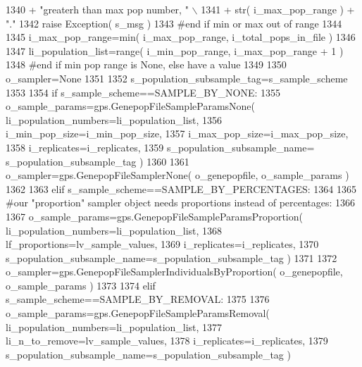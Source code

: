 \begin{DoxyCode}
1340                         + \textcolor{stringliteral}{"greaterh than max pop number, "} \(\backslash\)
1341                         + str( i\_max\_pop\_range ) + \textcolor{stringliteral}{"."} 
1342             \textcolor{keywordflow}{raise} Exception( s\_msg )
1343         \textcolor{comment}{#end if min or max out of range}
1344 
1345         i\_max\_pop\_range=min( i\_max\_pop\_range, i\_total\_pops\_in\_file )
1346 
1347         li\_population\_list=range( i\_min\_pop\_range, i\_max\_pop\_range + 1 )
1348     \textcolor{comment}{#end if min pop range is None, else have a value}
1349 
1350     o\_sampler=\textcolor{keywordtype}{None}  
1351 
1352     s\_population\_subsample\_tag=s\_sample\_scheme
1353 
1354     \textcolor{keywordflow}{if} s\_sample\_scheme==SAMPLE\_BY\_NONE:
1355         o\_sample\_params=gps.GenepopFileSampleParamsNone( li\_population\_numbers=li\_population\_list,
1356                                                             i\_min\_pop\_size=i\_min\_pop\_size,
1357                                                             i\_max\_pop\_size=i\_max\_pop\_size,
1358                                                             i\_replicates=i\_replicates,
1359                                                             s\_population\_subsample\_name=
      s\_population\_subsample\_tag )    
1360 
1361         o\_sampler=gps.GenepopFileSamplerNone( o\_genepopfile, o\_sample\_params )
1362 
1363     \textcolor{keywordflow}{elif} s\_sample\_scheme==SAMPLE\_BY\_PERCENTAGES:
1364 
1365         \textcolor{comment}{#our "proportion" sampler object needs proportions instead of percentages:}
1366 
1367         o\_sample\_params=gps.GenepopFileSampleParamsProportion( li\_population\_numbers=li\_population\_list,
1368                                                 lf\_proportions=lv\_sample\_values,
1369                                                 i\_replicates=i\_replicates,
1370                                                 s\_population\_subsample\_name=s\_population\_subsample\_tag )
1371 
1372         o\_sampler=gps.GenepopFileSamplerIndividualsByProportion( o\_genepopfile, o\_sample\_params )
1373 
1374     \textcolor{keywordflow}{elif} s\_sample\_scheme==SAMPLE\_BY\_REMOVAL:
1375 
1376         o\_sample\_params=gps.GenepopFileSampleParamsRemoval( li\_population\_numbers=li\_population\_list,
1377                                                 li\_n\_to\_remove=lv\_sample\_values,
1378                                                 i\_replicates=i\_replicates,
1379                                                 s\_population\_subsample\_name=s\_population\_subsample\_tag )

\end{DoxyCode}
